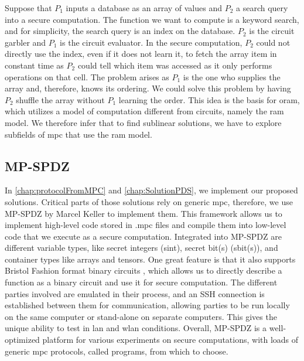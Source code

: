 Suppose that $ P_1 $ inputs a database as an array of values and $ P_2 $ a search query into a secure computation. The function we want to compute is a keyword search, and for simplicity, the search query is an index on the database. $ P_2 $ is the circuit garbler and $ P_1 $ is the circuit evaluator. In the secure computation, $ P_2 $ could not directly use the index, even if it does not learn it, to fetch the array item in constant time as $ P_2 $ could tell which item was accessed as it only performs operations on that cell. The problem arises as $ P_1 $ is the one who supplies the array and, therefore, knows its ordering. We could solve this problem by having $ P_2 $ shuffle the array without $ P_1 $ learning the order. This idea is the basis for \acrshort{oram}, which utilizes a model of computation different from circuits, namely the \acrshort{ram} model. We therefore infer that to find sublinear solutions, we have to explore subfields of \acrshort{mpc} that use the \acrshort{ram} model.

\subsection*{\thesubsection\quad MP-SPDZ}\label{subsec:MPSPDZ}

In \cref{chap:protocolFromMPC} and \cref{chap:SolutionPDS}, we implement our proposed solutions. Critical parts of those solutions rely on generic \acrshort{mpc}, therefore, we use MP-SPDZ \cite{CCS:Keller20} by Marcel Keller to implement them. This framework allows us to implement high-level code stored in .mpc files and compile them into low-level code that we execute as a secure computation. Integrated into MP-SPDZ are different variable types, like secret integers (sint), secret bit(s) (sbit(s)), and container types like arrays and tensors. One great feature is that it also supports Bristol Fashion format binary circuits \cite{bristol2020}, which allows us to directly describe a function as a binary circuit and use it for secure computation. The different parties involved are emulated in their process, and an SSH connection is established between them for communication, allowing parties to be run locally on the same computer or stand-alone on separate computers. This gives the unique ability to test in \acrshort{lan} and \acrfull{wlan} conditions. Overall, MP-SPDZ is a well-optimized platform for various experiments on secure computations, with loads of generic \acrshort{mpc} protocols, called programs, from which to choose.